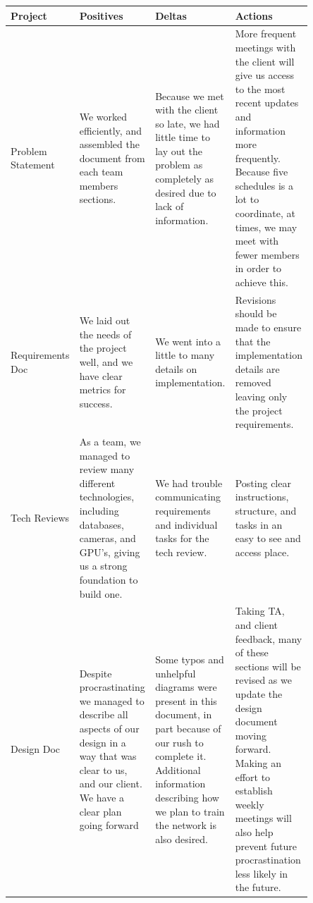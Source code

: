 \documentclass[onecolumn, draftclsnofoot,10pt, compsoc]{IEEEtran}
\begin{document}
\begin{center}
\begin{tabular}{
|p{0.1\linewidth}
|p{0.25\linewidth}
|p{0.25\linewidth}
|p{0.25\linewidth}|
}
\hline
Project & Positives & Deltas & Actions \\\hline
Problem Statement & We worked efficiently, and assembled the document from each team members sections. & Because we met with the client so late, we had little time to lay out the problem as completely as desired due to lack of information.  & More frequent meetings with the client will give us access to the most recent updates and information more frequently. Because five schedules is a lot to coordinate, at times, we may meet with fewer members in order to achieve this. \\\hline
Requirements Doc & We laid out the needs of the project well, and we have clear metrics for success.  & We went into a little to many details on implementation. & Revisions should be made to ensure that the implementation details are removed leaving only the project requirements.  \\\hline
Tech Reviews  & As a team, we managed to review many different technologies, including databases, cameras, and GPU's, giving us a strong foundation to build one. & We had trouble communicating requirements and individual tasks for the tech review. & Posting clear instructions, structure, and tasks in an easy to see and access place. \\\hline
Design Doc & Despite procrastinating we managed to describe all aspects of our design in a way that was clear to us, and our client. We have a clear plan going forward & Some typos and unhelpful diagrams were present in this document, in part because of our rush to complete it. Additional information describing how we plan to train the network is also desired. & Taking TA, and client feedback, many of these sections will be revised as we update the design document moving forward. Making an effort to establish weekly meetings will also help prevent future procrastination less likely in the future. \\\hline
\end{tabular}

\end{center}
\end{document}
